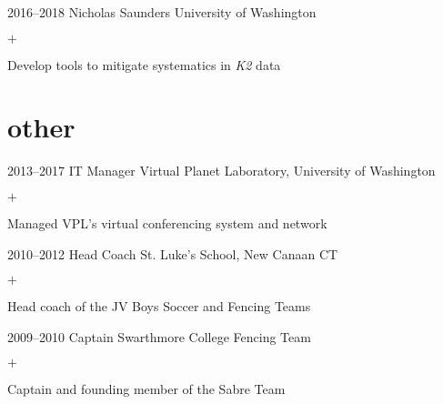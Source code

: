 \documentclass[]{luger-cv} %
\begin{document}
\begin{entrylist}
        \entry
        {2016--2018}
        {Nicholas Saunders}
        {University of Washington}
        {%
            \vspace{-1em}
            \begin{list}{$+$}{\cvlist}
                \item Develop tools to mitigate systematics in \emph{K2} data
            \end{list}
        }


    \end{entrylist}
\fi


\ifdefined \withother

    \section{other}
    \begin{entrylist}


        \entry
        {2013--2017}
        {IT Manager}
        {Virtual Planet Laboratory, University of Washington}
        {%
            \vspace{-1em}
            \begin{list}{$+$}{\cvlist}
                \item Managed VPL's virtual conferencing system and network
            \end{list}
        }


        \entry
        {2010--2012}
        {Head Coach}
        {St. Luke's School, New Canaan CT}
        {%
            \vspace{-1em}
            \begin{list}{$+$}{\cvlist}
                \item Head coach of the JV Boys Soccer and Fencing Teams
            \end{list}
        }


        \entry
        {2009--2010}
        {Captain}
        {Swarthmore College Fencing Team}
        {%
            \vspace{-1em}
            \begin{list}{$+$}{\cvlist}
                \item Captain and founding member of the Sabre Team
            \end{list}
        }


    \end{entrylist}
\fi
\end{document}
